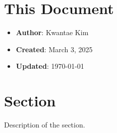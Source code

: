 \documentclass[a4paper,12pt]{article}
\begin{document}
\section{This Document}

\begin{itemize}
    \item \textbf{Author}: Kwantae Kim
    \item \textbf{Created}: March 3, 2025
    \item \textbf{Updated}: \today
\end{itemize}

\pagebreak


\section{Section}

Description of the section.

\label{lastpage}
\end{document}
